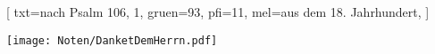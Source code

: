 [
    txt={nach Psalm 106, 1},
    gruen={93}, pfi={11},
    mel={aus dem 18. Jahrhundert},
    ]

\centering\texttt{[image: Noten/DanketDemHerrn.pdf]}

\endsong

